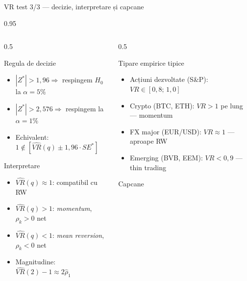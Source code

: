 \documentclass[9pt, aspectratio=169, t]{beamer}
\begin{document}
\begin{frame}[shrink=10]{VR test 3/3 --- decizie, interpretare și capcane}
\begin{cminipage}{0.95\textwidth}
\begin{columns}[T]
\begin{column}{0.5\textwidth}
\begin{block}{Regula de decizie}
\footnotesize
\begin{itemize}\setlength{\itemsep}{0pt}
    \item $|Z^*| > 1{,}96 \Rightarrow$ respingem $H_0$ la $\alpha = 5\%$
    \item $|Z^*| > 2{,}576 \Rightarrow$ respingem la $\alpha = 1\%$
    \item Echivalent: $1 \notin [\widehat{VR}(q) \pm 1{,}96 \cdot SE^*]$
\end{itemize}
\end{block}
\begin{exampleblock}{Interpretare}
\footnotesize
\begin{itemize}\setlength{\itemsep}{0pt}
    \item $\widehat{VR}(q) \approx 1$: compatibil cu RW
    \item $\widehat{VR}(q) > 1$: \emph{momentum}, $\rho_k > 0$ net
    \item $\widehat{VR}(q) < 1$: \emph{mean reversion}, $\rho_k < 0$ net
    \item Magnitudine: $\widehat{VR}(2) - 1 \approx 2\hat\rho_1$
\end{itemize}
\end{exampleblock}
\end{column}
\begin{column}{0.5\textwidth}
\begin{exampleblock}{Tipare empirice tipice}
\footnotesize
\begin{itemize}\setlength{\itemsep}{0pt}
    \item Acțiuni dezvoltate (S\&P): $VR \in [0{,}8;\, 1{,}0]$
    \item Crypto (BTC, ETH): $VR > 1$ pe lung --- momentum
    \item FX major (EUR/USD): $VR \approx 1$ --- aproape RW
    \item Emerging (BVB, EEM): $VR < 0{,}9$ --- thin trading
\end{itemize}
\end{exampleblock}
\begin{alertblock}{Capcane}
\footnotesize
\begin{itemize}\setlength{\itemsep}{0pt}

\end{itemize}
\end{alertblock}
\end{column}
\end{columns}
\end{cminipage}
\end{frame}
\end{document}
